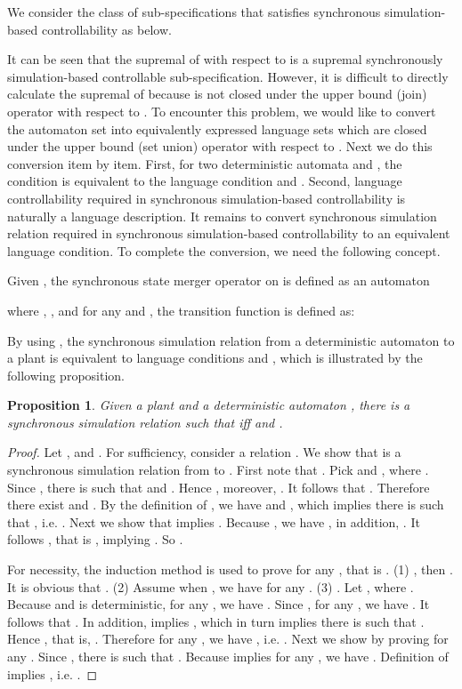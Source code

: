 \documentclass[preprint,authoryear,12pt]{elsarticle}
\newtheorem{Proposition}{Proposition}
\begin{document}
We consider the class of sub-specifications that satisfies
synchronous simulation-based controllability as below.


It can be seen that the supremal of  with respect to  is a supremal synchronously simulation-based controllable
sub-specification. However, it is difficult to directly calculate
the supremal of  because  is not closed under the upper
bound (join) operator with respect to 
\citep{zhoubisimilarity2011}. To encounter this problem, we would
like to convert the automaton set  into equivalently
expressed language sets which are closed under the upper bound
(set union) operator with respect to 
\citep{cassandras2008introduction}. Next we do this conversion
item by item. First, for two deterministic automata  and ,
the condition  is equivalent to the language condition
 and . Second,
language controllability required in synchronous simulation-based
controllability is naturally a language description. It remains to
convert synchronous simulation relation required in synchronous
simulation-based controllability to an equivalent language
condition. To complete the conversion, we need the following
concept.



\begin{Definition}
Given , the synchronous state
merger operator on  is defined as an automaton

where , , and for any  and , the
transition function is defined as:



\end{Definition}





By using , the synchronous simulation relation from a
deterministic automaton  to a plant  is equivalent to
language conditions  and
, which is illustrated by
the following proposition.

\begin{Proposition}\label{gsyn}
Given a plant  and a deterministic automaton , there is a
synchronous simulation relation  such that  iff  and
.
\end{Proposition}
\begin{proof}
Let ,
 and
.
For sufficiency, consider a relation . We show that  is a
synchronous simulation relation from  to . First note
that . Pick  and , where . Since , there is  such that
 and . Hence
, moreover, . It follows that .
Therefore there exist  and . By the definition of , we have
 and , which
implies there is  such that , i.e. . Next we show that
 implies . Because ,
we have , in addition, . It follows , that is
, implying . So
.

For necessity, the induction method is used to prove  for any , that is . (1) , then . It is obvious that
. (2) Assume when , we have  for any . (3) . Let
, where . Because  and  is deterministic, for any , we have .
Since , for any , we have . It follows that . In addition,
 implies , which in turn implies
there is  such that .
Hence , that is, . Therefore for
any , we have , i.e. . Next we show  by proving  for any
. Since , there is  such that . Because
 implies  for any
, we have . Definition
of  implies , i.e. .
\end{proof}
\end{document}
